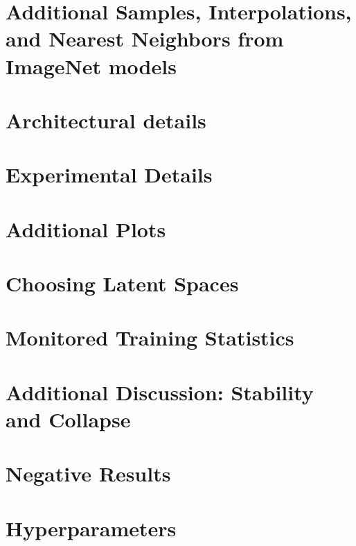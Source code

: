 \documentclass{article} %
\begin{document}
\begin{appendices}

\newpage
\section{Additional Samples, Interpolations, and Nearest Neighbors from ImageNet models}
\label{appendix_samples}



\newpage
\section{Architectural details}
\label{appendix_architecture}


\newpage
\section{Experimental Details}
\label{appendix_experimental_details}


\newpage
\section{Additional Plots}
\label{appendix_additional_plots}

\clearpage

\newpage
\section{Choosing Latent Spaces}
\label{appendix_latents}





\newpage
\section{Monitored Training Statistics}
\label{appendix_monitored_stats}


\newpage
\section{Additional Discussion: Stability and Collapse}
\label{appendix_additional_discussion}



\newpage
\section{Negative Results}
\label{appendix_negative_results}



\newpage
\section{Hyperparameters}
\label{appendix_sweeps}


\end{appendices}
\end{document}
